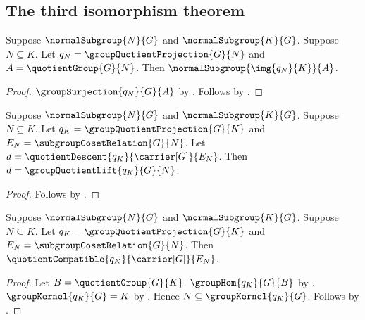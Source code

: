 \subsection{The third isomorphism theorem}

\begin{theorem}\label{group_third_isomorphism_image_normal}
    Suppose $\normalSubgroup{N}{G}$ and $\normalSubgroup{K}{G}$.
    Suppose $N\subseteq K$.
    Let $q_N=\groupQuotientProjection{G}{N}$ and
        $A=\quotientGroup{G}{N}$.
    Then $\normalSubgroup{\img{q_N}{K}}{A}$.
\end{theorem}
\begin{proof}
    $\groupSurjection{q_N}{G}{A}$ by
        .
    Follows by .
\end{proof}

\begin{proposition}\label{group_quotient_comparison_eq_group_quotient_lift}
    Suppose $\normalSubgroup{N}{G}$ and $\normalSubgroup{K}{G}$.
    Suppose $N\subseteq K$.
    Let $q_K=\groupQuotientProjection{G}{K}$ and
        $E_N=\subgroupCosetRelation{G}{N}$.
    Let $d=\quotientDescent{q_K}{\carrier[G]}{E_N}$.
    Then $d=\groupQuotientLift{q_K}{G}{N}$.
\end{proposition}
\begin{proof}
    Follows by .
\end{proof}

\begin{theorem}\label{group_quotient_comparison_compatible}
    Suppose $\normalSubgroup{N}{G}$ and $\normalSubgroup{K}{G}$.
    Suppose $N\subseteq K$.
    Let $q_K=\groupQuotientProjection{G}{K}$ and
        $E_N=\subgroupCosetRelation{G}{N}$.
    Then $\quotientCompatible{q_K}{\carrier[G]}{E_N}$.
\end{theorem}
\begin{proof}
    Let $B=\quotientGroup{G}{K}$.
    $\groupHom{q_K}{G}{B}$ by
        .
    $\groupKernel{q_K}{G}=K$ by
        .
    Hence $N\subseteq\groupKernel{q_K}{G}$.
    Follows by .
\end{proof}

